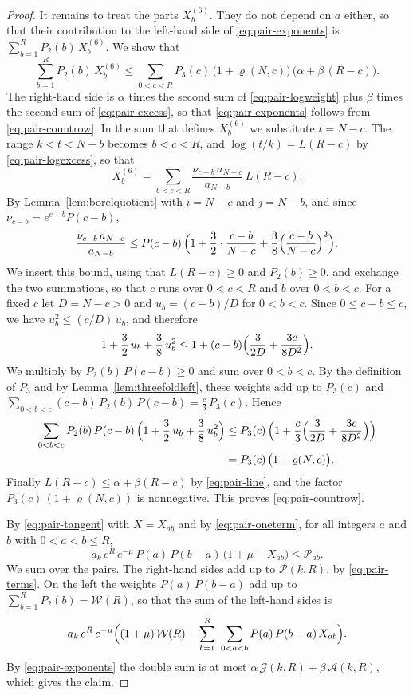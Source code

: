 \documentclass{amsart}
\theoremstyle{definition}
\theoremstyle{remark}
\numberwithin{equation}{section}
\begin{document}
\begin{proof}
It remains to treat the parts $X^{(6)}_{b}$. They do not depend on $a$
either, so that their contribution to the left-hand side of
\eqref{eq:pair-exponents} is $\sum_{b=1}^{R}P_2(b)\,X^{(6)}_{b}$. We show
that
\begin{equation}\label{eq:pair-countrow}
\sum_{b=1}^{R}P_2(b)\,X^{(6)}_{b}
\le\sum_{0<c<R}P_3(c)\,\bigl(1+\varrho(N,c)\bigr)\,
\bigl(\alpha+\beta\,(R-c)\bigr).
\end{equation}
The right-hand side is $\alpha$ times the second sum of
\eqref{eq:pair-logweight} plus $\beta$ times the second sum of
\eqref{eq:pair-excess}, so that \eqref{eq:pair-exponents} follows from
\eqref{eq:pair-countrow}. In the
sum that defines $X^{(6)}_{b}$ we substitute $t=N-c$. The range $k<t<N-b$
becomes $b<c<R$, and $\log(t/k)=L(R-c)$ by \eqref{eq:pair-logexcess}, so
that
\[
X^{(6)}_{b}=\sum_{b<c<R}\frac{\nu_{c-b}\,a_{N-c}}{a_{N-b}}\,L(R-c).
\]
By Lemma~\ref{lem:borelquotient} with $i=N-c$ and $j=N-b$, and since
$\nu_{c-b}=e^{c-b}P(c-b)$,
\[
\frac{\nu_{c-b}\,a_{N-c}}{a_{N-b}}
\le P(c-b)\,\Bigl(1+\frac32\cdot\frac{c-b}{N-c}
+\frac38\Bigl(\frac{c-b}{N-c}\Bigr)^2\Bigr).
\]
We insert this bound, using that $L(R-c)\ge0$ and $P_2(b)\ge0$, and
exchange the two summations, so that $c$ runs over $0<c<R$ and $b$ over
$0<b<c$. For a fixed $c$ let $D=N-c>0$ and $u_b=(c-b)/D$ for $0<b<c$.
Since $0\le c-b\le c$, we have $u_b^2\le(c/D)\,u_b$, and therefore
\[
1+\frac32\,u_b+\frac38\,u_b^2
\le1+(c-b)\Bigl(\frac{3}{2D}+\frac{3c}{8D^2}\Bigr).
\]
We multiply by $P_2(b)\,P(c-b)\ge0$ and sum over $0<b<c$. By the definition
of $P_3$ and by Lemma~\ref{lem:threefoldleft}, these weights add up to
$P_3(c)$ and $\sum_{0<b<c}(c-b)\,P_2(b)\,P(c-b)=\frac c3\,P_3(c)$. Hence
\begin{align*}
\sum_{0<b<c}P_2(b)\,P(c-b)\,\Bigl(1+\frac32\,u_b+\frac38\,u_b^2\Bigr)
&\le P_3(c)\,\Bigl(1+\frac c3\Bigl(\frac{3}{2D}+\frac{3c}{8D^2}\Bigr)\Bigr)\\
&=P_3(c)\,\bigl(1+\varrho(N,c)\bigr).
\end{align*}
Finally $L(R-c)\le\alpha+\beta(R-c)$ by \eqref{eq:pair-line}, and the factor
$P_3(c)\,(1+\varrho(N,c))$ is nonnegative. This proves
\eqref{eq:pair-countrow}.

By \eqref{eq:pair-tangent} with $X=X_{ab}$ and by
\eqref{eq:pair-oneterm}, for all integers $a$ and $b$ with $0<a<b\le R$,
\[
a_k\,e^{R}\,e^{-\mu}\,P(a)\,P(b-a)\,\bigl(1+\mu-X_{ab}\bigr)\le\mathcal P_{ab}.
\]
We sum over the pairs. The right-hand sides add up to $\mathcal P(k,R)$, by
\eqref{eq:pair-terms}. On the left the weights $P(a)\,P(b-a)$ add up to
$\sum_{b=1}^{R}P_2(b)=\mathcal W(R)$, so that the sum of the left-hand sides
is
\[
a_k\,e^{R}\,e^{-\mu}\Bigl((1+\mu)\,\mathcal W(R)
-\sum_{b=1}^{R}\ \sum_{0<a<b}P(a)\,P(b-a)\,X_{ab}\Bigr).
\]
By \eqref{eq:pair-exponents} the double sum is at most
$\alpha\,\mathcal G(k,R)+\beta\,\mathcal A(k,R)$, which gives the claim.
\end{proof}
\end{document}
